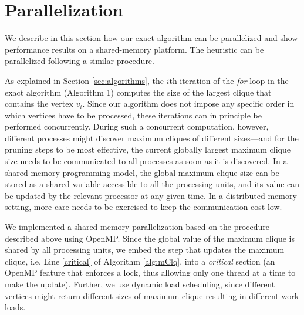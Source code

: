 \section{Parallelization}
\label{sec:parallelization}


 We describe in this section how our exact algorithm can be parallelized and show performance results
on a shared-memory platform. The heuristic can be parallelized following a similar procedure.

As explained in Section \ref{sec:algorithms}, the $i$th iteration of the {\em for} loop in the exact algorithm (Algorithm 1) computes the size of the largest clique that contains the vertex $v_i$. Since our algorithm does not impose any specific order in which vertices have to be processed, these iterations can in principle be performed concurrently. During such a concurrent computation, however, different processes might discover maximum cliques of different sizes---and for the pruning steps to be most effective, the current globally largest maximum clique size needs to be communicated to all processes as soon as it is discovered. In a shared-memory programming model, the global maximum clique size can be stored as a shared variable accessible to all the processing units, and its value can be updated by the relevant processor at any given time. In a distributed-memory setting, more care needs to be exercised to keep the communication cost low. 

We implemented a shared-memory parallelization based on the procedure described above using OpenMP. Since the global value of the maximum clique is shared by all processing units, we embed the step that updates the maximum clique, i.e. Line \ref{critical} of Algorithm \ref{alg:mClq}, into a {\it critical} section (an OpenMP feature that enforces a lock, thus allowing only one thread at a time to make the update). Further, we use dynamic load scheduling, since different vertices might return different sizes of maximum clique resulting in different work loads.

